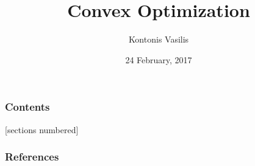 \documentclass[10pt]{beamer}
\begin{document}
\title{Convex Optimization}
\subtitle{}
\author{Kontonis Vasilis}

\date{24 February, 2017}
\maketitle


\begin{frame}
  \frametitle{Contents}
  [sections numbered]
  \tableofcontents[hideallsubsections]
\end{frame}



\nocite{boyd_linear_1997}
\nocite{boyd_convex_2004}
\nocite{boyd_fastest_2004}
\nocite{goemans_improved_1995}


\begin{frame}[allowframebreaks]
  \frametitle{References}
  
  
\end{frame}
\end{document}
